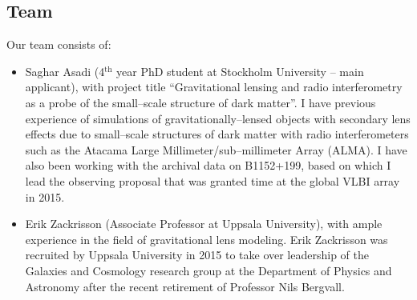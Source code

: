 \documentclass[a4paper, 11pt]{article}
\begin{document}
\subsection{Team}
Our team consists of:
\begin{itemize}
\item Saghar Asadi (4$^\mathrm{th}$ year PhD student at Stockholm University -- main applicant), with project title ``Gravitational lensing and radio interferometry as a probe of the small--scale structure of dark matter''. I have previous experience of simulations of gravitationally--lensed objects with secondary lens effects due to small--scale structures of dark matter with radio interferometers such as the Atacama Large Millimeter/sub--millimeter Array (ALMA). I have also been working with the archival data on B1152+199, based on which I lead the observing proposal that was granted time at the global VLBI array in 2015.
\item Erik Zackrisson (Associate Professor at Uppsala University), with ample experience in the field of gravitational lens modeling. Erik Zackrisson was recruited by Uppsala University in 2015 to take over leadership of the Galaxies and Cosmology research group at the Department of Physics and Astronomy after the recent retirement of Professor Nils Bergvall.
\end{itemize}
\end{document}
